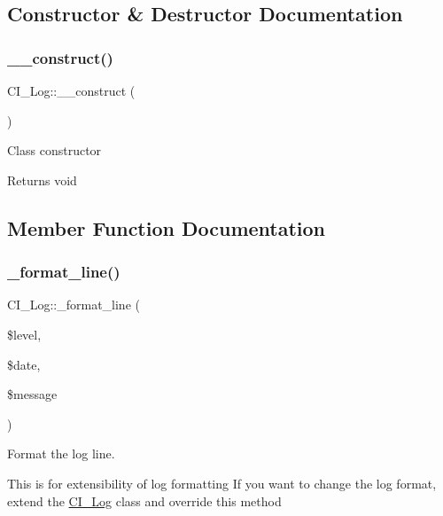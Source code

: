 \subsection{Constructor \& Destructor Documentation}
\mbox{\label{class_c_i___log_af5605c4ff273176a36b6e4dc4876201f}} 
\subsubsection{\texorpdfstring{\+\_\+\+\_\+construct()}{\_\_construct()}}
{\footnotesize\ttfamily C\+I\+\_\+\+Log\+::\+\_\+\+\_\+construct (\begin{DoxyParamCaption}{ }\end{DoxyParamCaption})}

Class constructor

\begin{DoxyReturn}{Returns}
void 
\end{DoxyReturn}


\subsection{Member Function Documentation}
\mbox{\label{class_c_i___log_ab5bf7e6663af7019bd38f9540a344459}} 
\subsubsection{\texorpdfstring{\+\_\+format\+\_\+line()}{\_format\_line()}}
{\footnotesize\ttfamily C\+I\+\_\+\+Log\+::\+\_\+format\+\_\+line (\begin{DoxyParamCaption}\item[{}]{\$level,  }\item[{}]{\$date,  }\item[{}]{\$message }\end{DoxyParamCaption})\hspace{0.3cm}{\ttfamily [protected]}}

Format the log line.

This is for extensibility of log formatting If you want to change the log format, extend the \mbox{\hyperlink{class_c_i___log}{C\+I\+\_\+\+Log}} class and override this method


